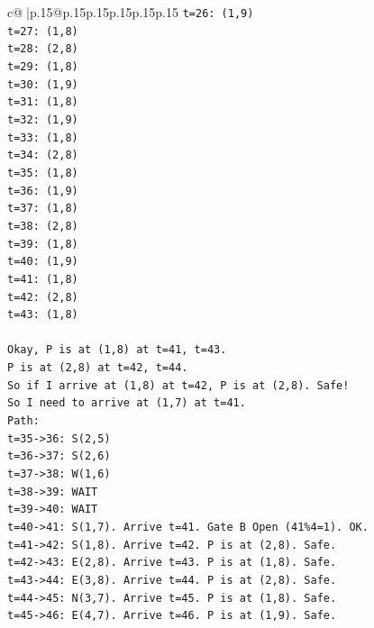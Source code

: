 \documentclass{article}
\begin{document}
{\begin{supertabular}{c@{$\;$}|p{.15\linewidth}@{}p{.15\linewidth}p{.15\linewidth}p{.15\linewidth}p{.15\linewidth}p{.15\linewidth}}
{{{\texttt{t=26: (1,9)} \\
\texttt{t=27: (1,8)} \\
\texttt{t=28: (2,8)} \\
\texttt{t=29: (1,8)} \\
\texttt{t=30: (1,9)} \\
\texttt{t=31: (1,8)} \\
\texttt{t=32: (1,9)} \\
\texttt{t=33: (1,8)} \\
\texttt{t=34: (2,8)} \\
\texttt{t=35: (1,8)} \\
\texttt{t=36: (1,9)} \\
\texttt{t=37: (1,8)} \\
\texttt{t=38: (2,8)} \\
\texttt{t=39: (1,8)} \\
\texttt{t=40: (1,9)} \\
\texttt{t=41: (1,8)} \\
\texttt{t=42: (2,8)} \\
\texttt{t=43: (1,8)} \\
\\ 
\texttt{Okay, P is at (1,8) at t=41, t=43.} \\
\texttt{P is at (2,8) at t=42, t=44.} \\
\texttt{So if I arrive at (1,8) at t=42, P is at (2,8). Safe!} \\
\texttt{So I need to arrive at (1,7) at t=41.} \\
\texttt{Path:} \\
\texttt{t=35{-}>36: S(2,5)} \\
\texttt{t=36{-}>37: S(2,6)} \\
\texttt{t=37{-}>38: W(1,6)} \\
\texttt{t=38{-}>39: WAIT} \\
\texttt{t=39{-}>40: WAIT} \\
\texttt{t=40{-}>41: S(1,7). Arrive t=41. Gate B Open (41\%4=1). OK.} \\
\texttt{t=41{-}>42: S(1,8). Arrive t=42. P is at (2,8). Safe.} \\
\texttt{t=42{-}>43: E(2,8). Arrive t=43. P is at (1,8). Safe.} \\
\texttt{t=43{-}>44: E(3,8). Arrive t=44. P is at (2,8). Safe.} \\
\texttt{t=44{-}>45: N(3,7). Arrive t=45. P is at (1,8). Safe.} \\
\texttt{t=45{-}>46: E(4,7). Arrive t=46. P is at (1,9). Safe.} \\
}}}
\end{supertabular}}
\end{document}
